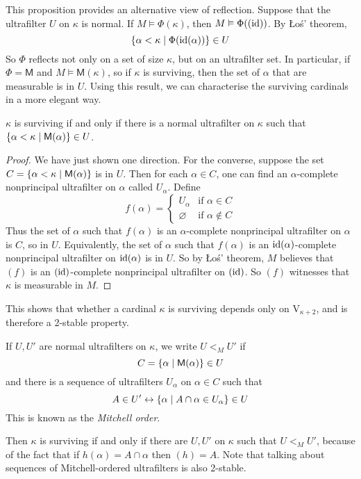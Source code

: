 This proposition provides an alternative view of reflection.
Suppose that the ultrafilter \( U \) on \( \kappa \) is normal.
If \( M \vDash \Phi(\kappa) \), then \( M \vDash \Phi((\operatorname{id})) \).
By \L{}o\'s' theorem,
\[ \qty{\alpha < \kappa \mid \Phi(\operatorname{id}(\alpha))} \in U \]
So \( \Phi \) reflects not only on a set of size \( \kappa \), but on an ultrafilter set.
In particular, if \( \Phi = \mathsf{M} \) and \( M \vDash \mathsf{M}(\kappa) \), so if \( \kappa \) is surviving, then the set of \( \alpha \) that are measurable is in \( U \).
Using this result, we can characterise the surviving cardinals in a more elegant way.
\begin{theorem}
    \( \kappa \) is surviving if and only if there is a normal ultrafilter on \( \kappa \) such that \( \qty{\alpha < \kappa \mid \mathsf{M}(\alpha)} \in U \).
\end{theorem}
\begin{proof}
    We have just shown one direction.
    For the converse, suppose the set \( C = \qty{\alpha < \kappa \mid \mathsf{M}(\alpha)} \) is in \( U \).
    Then for each \( \alpha \in C \), one can find an \( \alpha \)-complete nonprincipal ultrafilter on \( \alpha \) called \( U_\alpha \).
    Define
    \[ f(\alpha) = \begin{cases}
        U_\alpha & \text{if } \alpha \in C \\
        \varnothing & \text{if } \alpha \notin C
    \end{cases} \]
    Thus the set of \( \alpha \) such that \( f(\alpha) \) is an \( \alpha \)-complete nonprincipal ultrafilter on \( \alpha \) is \( C \), so in \( U \).
    Equivalently, the set of \( \alpha \) such that \( f(\alpha) \) is an \( \operatorname{id}(\alpha) \)-complete nonprincipal ultrafilter on \( \operatorname{id}(\alpha) \) is in \( U \).
    So by \L{}o\'s' theorem, \( M \) believes that \( (f) \) is an \( (\operatorname{id}) \)-complete nonprincipal ultrafilter on \( (\operatorname{id}) \).
    So \( (f) \) witnesses that \( \kappa \) is measurable in \( M \).
\end{proof}
This shows that whether a cardinal \( \kappa \) is surviving depends only on \( \mathrm{V}_{\kappa + 2} \), and is therefore a 2-stable property.
\begin{definition}
    If \( U, U' \) are normal ultrafilters on \( \kappa \), we write \( U <_M U' \) if
    \[ C = \qty{\alpha \mid \mathsf{M}(\alpha)} \in U \]
    and there is a sequence of ultrafilters \( U_\alpha \) on \( \alpha \in C \) such that
    \[ A \in U' \leftrightarrow \qty{\alpha \mid A \cap \alpha \in U_\alpha} \in U \]
    This is known as the \emph{Mitchell order}.
\end{definition}
Then \( \kappa \) is surviving if and only if there are \( U, U' \) on \( \kappa \) such that \( U <_M U' \), because of the fact that if \( h(\alpha) = A \cap \alpha \) then \( (h) = A \).
Note that talking about sequences of Mitchell-ordered ultrafilters is also 2-stable.
